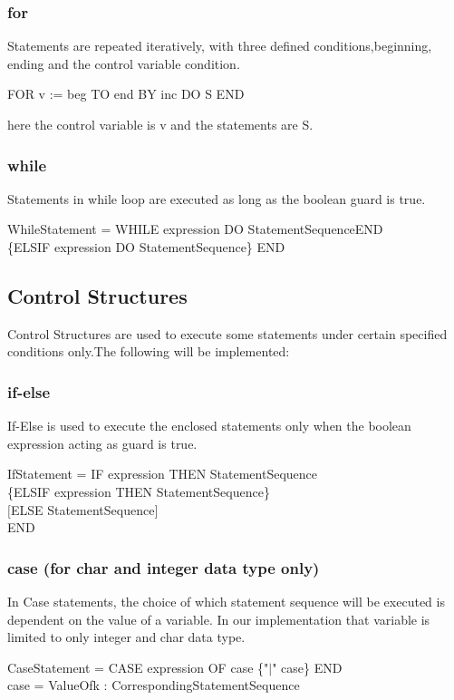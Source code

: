 \documentclass{article}
\begin{document}
\subsubsection{for}
Statements are repeated iteratively, with three defined conditions,beginning, ending and the control variable condition.
\begin{center}
FOR v := beg TO end BY inc DO S END
\end{center}
here the control variable is v and the statements are S.
\subsubsection{while}
Statements in while loop are executed as long as the boolean guard is true.
\begin{center}
WhileStatement = WHILE expression DO StatementSequenceEND\\
\{ELSIF expression DO StatementSequence\} END
\end{center}
\subsection{Control Structures}
Control Structures are used to execute some statements under certain specified conditions only.The following will be implemented:
\subsubsection{if-else}
If-Else is used to execute the enclosed statements only when the boolean expression acting as guard is true.
\begin{center}
IfStatement = IF expression THEN StatementSequence \\
\{ELSIF expression THEN StatementSequence\} \\
\hspace{-1.5in} $[$ELSE StatementSequence$]$ \\
\hspace{-3in} END
\end{center}
\subsubsection{case (for char and integer data type only)}
In Case statements, the choice of which statement sequence will be executed is dependent on the value of a variable. In our implementation that variable is limited to only integer and char data type.
\begin{center}
CaseStatement = CASE expression OF case \{"$|$" case\} END\\
\hspace{-0.5in}case = ValueOfk : CorrespondingStatementSequence
\end{center}
\end{document}
